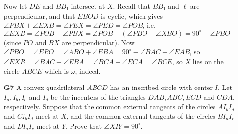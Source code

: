 \documentclass[11pt,a4paper]{article}
\begin{document}
\begin{enumerate}
    Now let $DE$ and $BB_1$ intersect at $X$. Recall that $BB_1$ and $\ell$ are perpendicular, and that $EBOD$ is cyclic, which gives $\angle PBX+\angle EXB=\angle PEX=\angle PED=\angle POB$, i.e. $\angle EXB=\angle POB-\angle PBX=\angle POB-(\angle PBO-\angle XBO)=90^{\circ}-\angle PBO$ (since $PO$ and $BX$ are perpendicular). Now $\angle PBO=\angle EBO=\angle ABO+\angle EBA=90^{\circ}-\angle BAC+\angle EAB$, so $\angle EXB=\angle BAC-\angle EBA=\angle BCA-\angle ECA=\angle BCE$, so $X$ lies on the circle $ABCE$ which is $\omega$, indeed. 
	
	\item[\textbf{G7}] A convex quadrilateral $ABCD$ has an inscribed circle with center $I$. Let $I_a, I_b, I_c$ and $I_d$ be the incenters of the triangles $DAB, ABC, BCD$ and $CDA$, respectively. Suppose that the common external tangents of the circles $AI_bI_d$ and $CI_bI_d$ meet at $X$, and the common external tangents of the circles $BI_aI_c$ and $DI_aI_c$ meet at $Y$. Prove that $\angle{XIY}=90^{\circ}$.
	

\end{enumerate}
\end{document}
